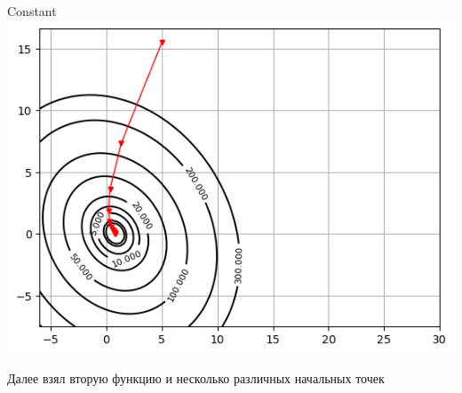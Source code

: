 \documentclass[12pt]{article}
\begin{document}
\begin{enumerate}
Constant
\includegraphics{exp1/strategies/3_constant.png}


\end{enumerate}


Далее взял вторую функцию и несколько различных начальных точек
\end{document}
